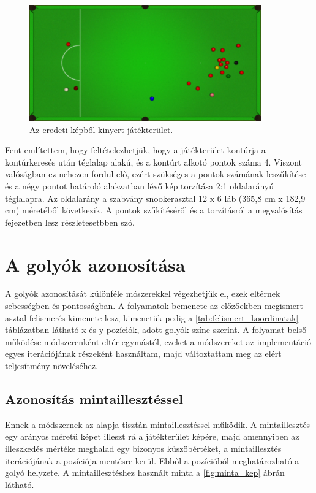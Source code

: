 \begin{figure}[!ht]
    \centering
    \includegraphics[width=100mm, keepaspectratio]{figures/input_table2.png}
    \caption{Az eredeti képből kinyert játékterület.}
    \label{fig:bemeneti_asztal2}
\end{figure}

\par Fent említettem, hogy feltételezhetjük, hogy a játékterület kontúrja a kontúrkeresés után téglalap alakú, és a kontúrt alkotó pontok száma 4. Viszont valóságban ez nehezen fordul elő, ezért szükséges a pontok számának leszűkítése és a négy pontot határoló alakzatban lévő kép torzítása 2:1 oldalarányú téglalapra. Az oldalarány a szabvány snookerasztal 12 x 6 láb (365,8 cm x 182,9 cm)\cite{snooker_rules} méretéből következik. A pontok szűkítéséről és a torzításról a megvalósítás fejezetben lesz részletesetbben szó.

\section{A golyók azonosítása}
A golyók azonosítását különféle mószerekkel végezhetjük el, ezek eltérnek sebességben és pontosságban. A folyamatok bemenete az előzőekben megismert asztal felismerés kimenete lesz, kimenetük pedig a \ref{tab:felismert_koordinatak} táblázatban látható x és y pozíciók, adott golyók színe szerint. A folyamat belső működése módszerenként eltér egymástól, ezeket a módszereket az implementáció egyes iterációjának részeként használtam, majd változtattam meg az elért teljesítmény növeléséhez.

\subsection{Azonosítás mintaillesztéssel}
Ennek a módszernek az alapja tisztán mintaillesztéssel működik. A mintaillesztés egy arányos méretű képet illeszt rá a játékterület képére, majd amennyiben az illeszkedés mértéke meghalad egy bizonyos küszöbértéket, a mintaillesztés iterációjának a pozíciója mentésre kerül. Ebből a pozícióból meghatározható a golyó helyzete. A mintaillesztéshez használt minta a \ref{fig:minta_kep} ábrán látható.

